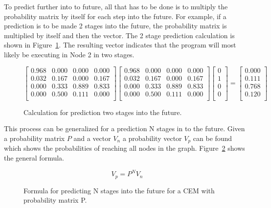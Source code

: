 To predict further into to future, all that has to be done is to
multiply the probability matrix by itself for each step into the future.
For example, if a
prediction is to be made 2 stages into the future, the probability
matrix is multiplied by itself and then the vector. The 2 stage
prediction calculation is shown in
Figure~\ref{fig:markov_pred_two_stage}. The resulting vector indicates that the
program will most likely be executing in Node 2 in two stages.

\begin{figure}[t!]
\centering
\[
\begin{bmatrix}
    0.968 & 0.000 & 0.000 & 0.000 \\
    0.032 & 0.167 & 0.000 & 0.167 \\
    0.000 & 0.333 & 0.889 & 0.833 \\
    0.000 & 0.500 & 0.111 & 0.000 \\
\end{bmatrix}
\begin{bmatrix}
    0.968 & 0.000 & 0.000 & 0.000 \\
    0.032 & 0.167 & 0.000 & 0.167 \\
    0.000 & 0.333 & 0.889 & 0.833 \\
    0.000 & 0.500 & 0.111 & 0.000 \\
\end{bmatrix}
\begin{bmatrix}
    0 \\
    1 \\
    0 \\
    0 \\
\end{bmatrix}
=
\begin{bmatrix}
    0.000 \\
    0.111 \\
    0.768 \\
    0.120 \\
\end{bmatrix}
\]
\caption{Calculation for prediction two stages into the future.}
\label{fig:markov_pred_two_stage}
\end{figure}

This process can be generalized for a prediction N stages in to the
future.  Given a probability matrix \(P\) and a vector \(V_{n}\) a
probability vector \(V_{p}\) can be found which shows the
probabilities of reaching all nodes in the
graph. Figure~\ref{fig:markov_pred_formula} shows the general formula.

\begin{figure}[h!]
\centering
\begin{equation*}
    V_{p} = P^{N}V_{n}
\end{equation*}
\caption{Formula for predicting N stages into the future for a CEM with
probability matrix P.}
\label{fig:markov_pred_formula}
\end{figure}

